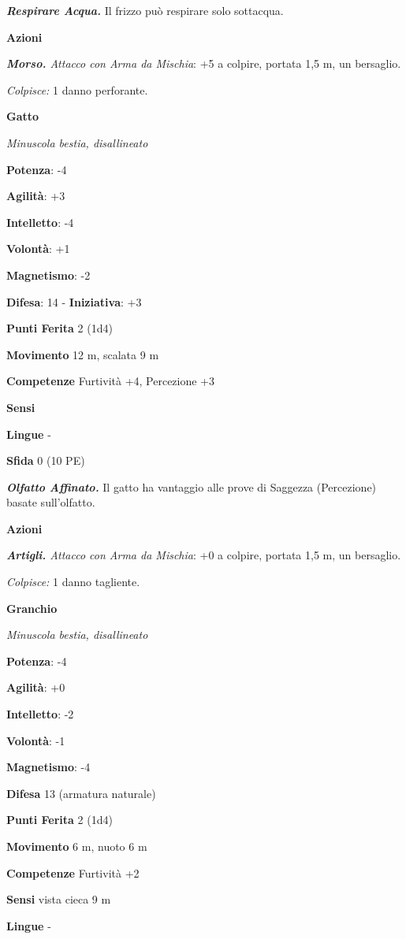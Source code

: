 \begin{multicols}{2}
\emph{\textbf{Respirare Acqua.}} Il frizzo può respirare solo sottacqua.

\textbf{Azioni}

\emph{\textbf{Morso.} Attacco con Arma da Mischia}: +5 a colpire,
portata 1,5 m, un bersaglio.

\emph{Colpisce:} 1 danno perforante.

\textbf{Gatto}

\emph{Minuscola bestia, disallineato}

\textbf{Potenza}: -4

\textbf{Agilità}: +3

\textbf{Intelletto}: -4

\textbf{Volontà}: +1

\textbf{Magnetismo}: -2

\textbf{Difesa}: 14 - \textbf{Iniziativa}: +3

\textbf{Punti Ferita} 2 (1d4)

\textbf{Movimento} 12 m, scalata 9 m

\textbf{Competenze} Furtività +4, Percezione +3

\textbf{Sensi} 

\textbf{Lingue} -

\textbf{Sfida} 0 (10 PE)

\emph{\textbf{Olfatto Affinato.}} Il gatto ha vantaggio alle prove di
Saggezza (Percezione) basate sull'olfatto.

\textbf{Azioni}

\emph{\textbf{Artigli.} Attacco con Arma da Mischia}: +0 a colpire,
portata 1,5 m, un bersaglio.

\emph{Colpisce:} 1 danno tagliente.

\textbf{Granchio}

\emph{Minuscola bestia, disallineato}

\textbf{Potenza}: -4

\textbf{Agilità}: +0

\textbf{Intelletto}: -2

\textbf{Volontà}: -1

\textbf{Magnetismo}: -4

\textbf{Difesa} 13 (armatura naturale)

\textbf{Punti Ferita} 2 (1d4)

\textbf{Movimento} 6 m, nuoto 6 m

\textbf{Competenze} Furtività +2

\textbf{Sensi} vista cieca 9 m

\textbf{Lingue} -


\end{multicols}
